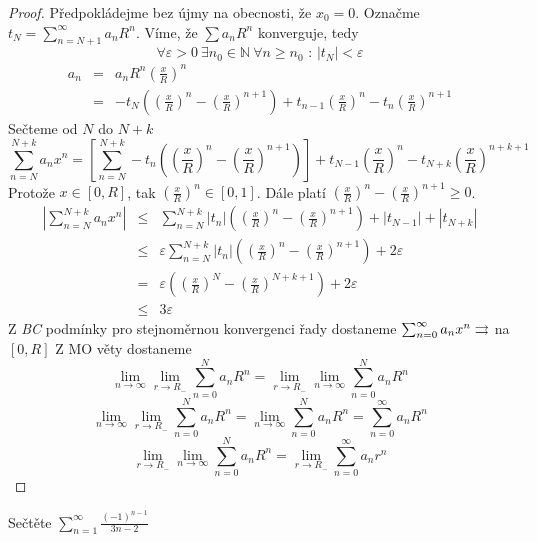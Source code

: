\begin{proof}
Předpokládejme bez újmy na obecnosti, že $x_0 = 0$. Označme $t_N = \sum_{n=N+1}^{\infty} a_n R^n$. Víme, že $\sum a_n R^n$ konverguje, tedy
$$\forall \varepsilon>0 \ \exists n_0 \in \mathbb{N} \ \forall n \geq n_0 \textrm{ : } |t_N| < \varepsilon$$
\begin{eqnarray*}
a_n & = & a_n R^n \left( \frac{x}{R} \right)^n \\
& = & - t_N \left( \left( \frac{x}{R} \right)^n - \left( \frac{x}{R} \right)^{n+1} \right) + t_{n-1} \left( \frac{x}{R} \right)^n - t_n \left( \frac{x}{R} \right)^{n+1} 
\end{eqnarray*}
Sečteme od $N$ do $N+k$
$$\sum_{n=N}^{N+k} a_n x^n = \left[ \sum_{n=N}^{N+k} -t_n \left( \left( \frac{x}{R} \right)^n - \left( \frac{x}{R} \right)^{n+1} \right) \right] + t_{N-1} \left( \frac{x}{R} \right)^n - t_{N+k} \left( \frac{x}{R} \right)^{n+k+1}$$
Protože $x \in [0, R]$, tak $\left( \frac{x}{R} \right)^n \in [0,1]$. Dále platí $\left( \frac{x}{R} \right)^{n} - \left( \frac{x}{R} \right)^{n+1} \geq 0$.
\begin{eqnarray*}
\left|\sum_{n=N}^{N+k} a_n x^n \right| & \leq & \sum_{n=N}^{N+k} |t_n| \left( \left( \frac{x}{R} \right)^{n} - \left( \frac{x}{R} \right)^{n+1} \right) + |t_{N-1}| + |t_{N+k}| \\
& \leq & \varepsilon \sum_{n=N}^{N+k} |t_n| \left( \left( \frac{x}{R} \right)^{n} - \left( \frac{x}{R} \right)^{n+1} \right) + 2 \varepsilon \\
& = & \varepsilon \left( \left( \frac{x}{R} \right)^{N} - \left( \frac{x}{R} \right)^{N+k+1} \right) + 2 \varepsilon \\
& \leq & 3 \varepsilon 
\end{eqnarray*}
Z \emph{BC} podmínky pro stejnoměrnou konvergenci řady dostaneme $\sum_{n=0}^{\infty} a_n x^n \rightrightarrows$ na $[0, R]$
Z MO věty dostaneme
$$\lim_{n \rightarrow \infty} \lim_{r \rightarrow R_-} \sum_{n=0}^{N} a_n R^n = \lim_{r \rightarrow R_-} \lim_{n \rightarrow \infty} \sum_{n=0}^{N} a_n R^n$$
$$\lim_{n \rightarrow \infty} \lim_{r \rightarrow R_-} \sum_{n=0}^{N} a_n R^n = \lim_{n \rightarrow \infty} \sum_{n=0}^{N} a_n R^n = \sum_{n=0}^{\infty} a_n R^n$$
$$\lim_{r \rightarrow R_-} \lim_{n \rightarrow \infty} \sum_{n=0}^{N} a_n R^n = \lim_{r \rightarrow R_-} \sum_{n=0}^{\infty} a_n r^n$$
\end{proof}

\begin{priklad}
Sečtěte $\sum_{n=1}^{\infty} \frac{(-1)^{n-1}}{3n-2}$
\end{priklad}


